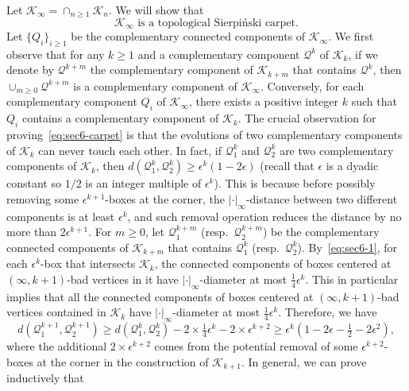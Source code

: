 \documentclass[a4paper]{article}
\numberwithin{equation}{section}
\numberwithin{equation}{section}
\renewcommand{\1}{\mathbf{1}}
\begin{document}
Let $\mathcal{K}_\infty = \cap_{n \geq 1} \mathcal{K}_n$. We will show that 
\begin{equation}\label{eq:sec6-carpet}
    \mathcal{K}_\infty \mbox{ is a topological Sierpi\'nski carpet.}
\end{equation}
Let $\{Q_i\}_{i \geq 1}$ be the complementary connected components of $\mathcal{K}_\infty$. We first observe that for any $k \ge 1$ and a complementary component $\mathcal Q^k$ of $\mathcal{K}_k$, if we denote by $\mathcal Q^{k+m}$ the complementary component of $\mathcal{K}_{k+m}$ that contains $\mathcal Q^k$, then $\cup_{m \ge 0} \mathcal Q^{k+m}$ is a complementary component of $\mathcal{K}_\infty$. Conversely, for each complementary component $Q_i$ of $\mathcal{K}_\infty$, there exists a positive integer $k$ such that $Q_i$ contains a complementary component of $\mathcal{K}_k$. The crucial observation for proving~\eqref{eq:sec6-carpet} is that the evolutions of two complementary components of $\mathcal{K}_k$ can never touch each other. In fact, if $\mathcal Q_1^k$ and $\mathcal Q_2^k$ are two complementary components of $\mathcal{K}_k$, then $d(\mathcal Q_1^k,\mathcal Q_2^k) \ge \epsilon^k(1-2 \epsilon )$ (recall that $\epsilon$ is a dyadic constant so $1/2$ is an integer multiple of $\epsilon^k$). This is because before possibly removing some $\epsilon^{k+1}$-boxes at the corner, the $|\cdot|_\infty$-distance between two different components is at least $\epsilon^k$, and such removal operation reduces the distance by no more than $2 \epsilon^{k+1}$.
    For $m \ge 0$, let $\mathcal Q_1^{k+m}$ (resp.\ $\mathcal Q_2^{k+m}$) be the complementary connected components of $\mathcal{K}_{k+m}$ that contains $\mathcal Q_1^k$ (resp.\ $\mathcal Q_2^k$). By~\eqref{eq:sec6-1}, for each $\epsilon^k$-box that intersects $\mathcal{K}_k$, the connected components of boxes centered at $(\infty, k+1)$-bad vertices in it have $|\cdot|_\infty$-diameter at most $\frac{1}{4}\epsilon^k$. This in particular implies that all the connected components of boxes centered at $(\infty, k+1)$-bad vertices contained in $\mathcal{K}_k$ have $|\cdot|_\infty$-diameter at most $\frac{1}{4}\epsilon^k$.
    Therefore, we have
    \[ d(\mathcal Q_1^{k+1},\mathcal Q_2^{k+1}) \ge d(\mathcal Q_1^k,\mathcal Q_2^k)-2 \times \tfrac{1}{4} \epsilon^k - 2 \times \epsilon^{k+2} \ge \epsilon^k (1- 2 \epsilon - \tfrac{1}{2} - 2\epsilon^2), \]
    where the additional $2 \times \epsilon^{k+2}$ comes from the potential removal of some $\epsilon^{k+2}$-boxes at the corner in the construction of $\mathcal{K}_{k+1}$. In general, we can prove inductively that
\end{document}
